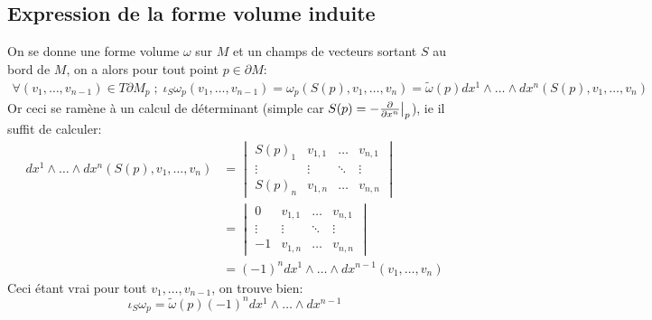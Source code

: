    \subsection*{Expression de la forme volume induite}
   On se donne une forme volume \( \omega \) sur \( M \) et un champs de vecteurs sortant \( S \) au bord de \( M \), on a alors pour tout point \( p \in \partial M \):
   \begin{align*}
      \forall (v_1, \ldots, v_{n-1}) \in T\partial M_p \; ; \; \iota_S\omega_p(v_1, \ldots, v_{n-1}) = \omega_p(S(p), v_1, \ldots, v_n) = \widetilde{\omega}(p)dx^1 \wedge \ldots \wedge dx^n(S(p), v_1, \ldots, v_n)
   \end{align*}
   Or ceci se ramène à un calcul de déterminant (simple car \( S(p) = - \frac{\partial }{\partial x^n}\big|_p \)), ie il suffit de calculer:
   \begin{align*}
      dx^1 \wedge \ldots \wedge dx^n(S(p), v_1, \ldots, v_n) &= \begin{vmatrix}
         S(p)_1 & v_{1, 1} & \ldots & v_{n, 1}\\
         \vdots & \vdots & \ddots & \vdots\\
         S(p)_n & v_{1, n} & \ldots & v_{n, n}
         \end{vmatrix}\\
      &= \begin{vmatrix}
         0 & v_{1, 1} & \ldots & v_{n, 1}\\
         \vdots & \vdots & \ddots & \vdots\\
         -1 & v_{1, n} & \ldots & v_{n, n}
         \end{vmatrix}\\
      &= (-1)^n dx^1 \wedge \ldots \wedge dx^{n-1}(v_1, \ldots, v_n)
   \end{align*}
   Ceci étant vrai pour tout \( v_1, \ldots, v_{n-1} \), on trouve bien:
   \[ 
      \iota_S\omega_p = \widetilde{\omega}(p)(-1)^n dx^1 \wedge \ldots \wedge dx^{n-1}
   \]
